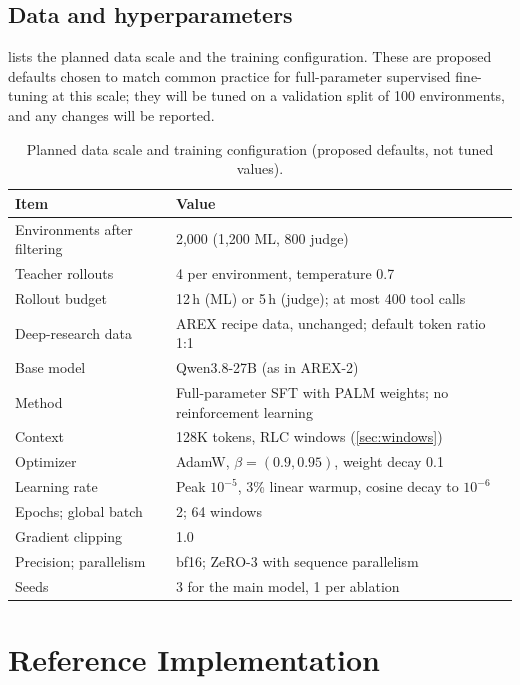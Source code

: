 \documentclass[11pt]{article}
\begin{document}
\subsection{Data and hyperparameters}
\label{sec:hparams}
 lists the planned data scale and the training configuration. These are proposed defaults chosen to match common practice for full-parameter supervised fine-tuning at this scale; they will be tuned on a validation split of 100 environments, and any changes will be reported.

\begin{table}[t]
\centering
\small
\caption{Planned data scale and training configuration (proposed defaults, not tuned values).}
\label{tab:hparams}
\begin{tabularx}{\linewidth}{@{}l Y@{}}
\toprule
Item & Value \\
\midrule
Environments after filtering & 2{,}000 (1{,}200 ML, 800 judge) \\
Teacher rollouts & 4 per environment, temperature 0.7 \\
Rollout budget & 12\,h (ML) or 5\,h (judge); at most 400 tool calls \\
Deep-research data & AREX recipe data, unchanged; default token ratio 1:1 \\
\midrule
Base model & Qwen3.8-27B (as in AREX-2) \\
Method & Full-parameter SFT with PALM weights; no reinforcement learning \\
Context & 128K tokens, RLC windows (\cref{sec:windows}) \\
Optimizer & AdamW, $\beta = (0.9, 0.95)$, weight decay 0.1 \\
Learning rate & Peak $10^{-5}$, 3\% linear warmup, cosine decay to $10^{-6}$ \\
Epochs; global batch & 2; 64 windows \\
Gradient clipping & 1.0 \\
Precision; parallelism & bf16; ZeRO-3 with sequence parallelism \\
Seeds & 3 for the main model, 1 per ablation \\
\bottomrule
\end{tabularx}
\end{table}

\section{Reference Implementation}
\label{sec:impl}
\end{document}
